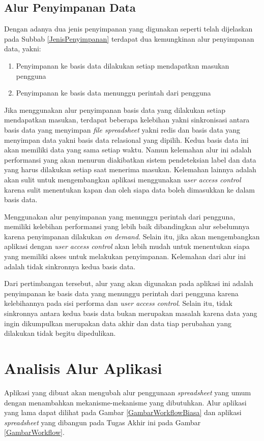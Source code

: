 	\subsection{Alur Penyimpanan Data}
	Dengan adanya dua jenis penyimpanan yang digunakan seperti telah dijelaskan pada Subbab \ref{JenisPenyimpanan} terdapat dua kemungkinan alur penyimpanan data, yakni:
	\begin{enumerate}
		\item Penyimpanan ke basis data dilakukan setiap mendapatkan masukan pengguna
		\item Penyimpanan ke basis data menunggu perintah dari pengguna
	\end{enumerate}
	Jika menggunakan alur penyimpanan basis data yang dilakukan setiap mendapatkan masukan, terdapat beberapa kelebihan yakni sinkronisasi antara basis data yang menyimpan \textit{file spreadsheet} yakni redis dan basis data yang menyimpan data yakni basis data relasional yang dipilih. Kedua basis data ini akan memiliki data yang sama setiap waktu. Namun kelemahan alur ini adalah performansi yang akan menurun diakibatkan sistem pendeteksian label dan data yang harus dilakukan setiap saat menerima masukan. Kelemahan lainnya adalah akan sulit untuk mengembangkan aplikasi menggunakan \textit{user access control} karena sulit menentukan kapan dan oleh siapa data boleh dimasukkan ke dalam basis data.

	Menggunakan alur penyimpanan yang menunggu perintah dari pengguna, memiliki kelebihan performansi yang lebih baik dibandingkan alur sebelumnya karena penyimpanan dilakukan \textit{on demand}. Selain itu, jika akan mengembangkan aplikasi dengan \textit{user access control} akan lebih mudah untuk menentukan siapa yang memiliki akses untuk melakukan penyimpanan. Kelemahan dari alur ini adalah tidak sinkronnya kedua basis data.

	Dari pertimbangan tersebut, alur yang akan digunakan pada aplikasi ini adalah penyimpanan ke basis data yang menunggu perintah dari pengguna karena kelebihannya pada sisi performa dan \textit{user access control}. Selain itu, tidak sinkronnya antara kedua basis data bukan merupakan masalah karena data yang ingin dikumpulkan merupakan data akhir dan data tiap perubahan yang dilakukan tidak begitu dipedulikan.

\section{Analisis Alur Aplikasi}
Aplikasi yang dibuat akan mengubah alur penggunaan \textit{spreadsheet} yang umum dengan menambahkan mekanisme-mekanisme yang dibutuhkan. Alur aplikasi yang lama dapat dilihat pada Gambar \ref{GambarWorkflowBiasa} dan aplikasi \textit{spreadsheet} yang dibangun pada Tugas Akhir ini pada Gambar \ref{GambarWorkflow}.

